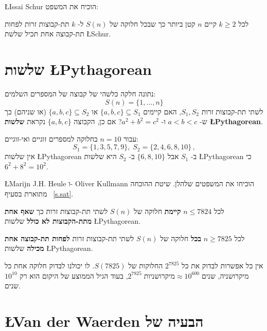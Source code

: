 \L{Issai Schur}
הוכיח את המשפט:
\begin{theorem}[\L{Schur}]
לכל 
$k\geq 2$
קיים 
$n$
קטן ביותר כך שבכל חלוקה של
$S(n)$
ל-%
$k$
תת-קבוצות זרות לפחות תת-קבוצה אחת תכיל שלשת
\L{Schur}.
\end{theorem}


\section{שלשות \L{Pythagorean}}\label{s.pyth}

\begin{definition}נתונה חלקה כלשהי של קבוצה של המספרים השלמים:
\[
S(n)=\{1,\ldots,n\}
\]
לשתי תת-קבוצות זרות
$S_1,S_2$,
האם קיימים
$\{a,b,c\}\subseteq S_1$
או
$\{a,b,c\}\subseteq S_2$
(או שניהם) כך ש-%
$a\!<\!b\!<\!c$
ו-%
$a^2+b^2=c^2$?
אם כן, הקבוצה 
$\{a,b,c\}$
נקראת 
\textbf{שלשות \L{Pythagorean}}.
\end{definition}

\begin{example}
עבור
$n=10$
בחלוקה למספרים זוגיים ואי-זוגיים:
\[
S_1 = \{1,3,5,7,9\},\; S_2=\{2,4,6,8,10\}\,,
\]
אין שלשות
\L{Pythagorean}
ב-%
$S_1$
אבל  
$\{6,8,10\}$
ב-%
$S_2$
היא
שלשות
\L{Pythagorean}
כי
$6^2+8^2=10^2$.
\end{example}

\L{Marijn J.H. Heule}
ו-%
Oliver Kullmann
הוכיחו את המשפטים שלהלן. שיטת ההוכחה מתוארת בסעיף%
~\ref{s.sat}.

\begin{theorem}
לכל 
$n\leq 7824$
\textbf{קיימת}
חלוקה של 
$S(n)$
לשתי תת-קבוצות זרות כך
\textbf{שאף אחת מתת-הקבוצות לא כולל}
שלשות
\L{Pythagorean}.
\end{theorem}

\begin{theorem}
לכל 
$n\geq 7825$
\textbf{בכל}
חלוקה של 
$S(n)$
לשתי תת-קבוצות זרות 
\textbf{לפחות תת-קבוצה אחת מכילה}
שלשות
\L{Pythagorean}.
\end{theorem}
אין כל אפשרות לבדוק את כל
$2^{7825}$
החלוקות של
$S(7825)$.
לו יכולנו לבדוק חלוקה אחת כל מיקרושניה, 
$2^{7825}\; \textrm{מיקרושניות}\approx 10^{600}\; \textrm{שנים}$, 
בעוד הגיל הממוצע של היקום הוא רק
$10^{10}$
שנים.


\section{\L{Van der Waerden} הבעיה של}\label{s.van}

